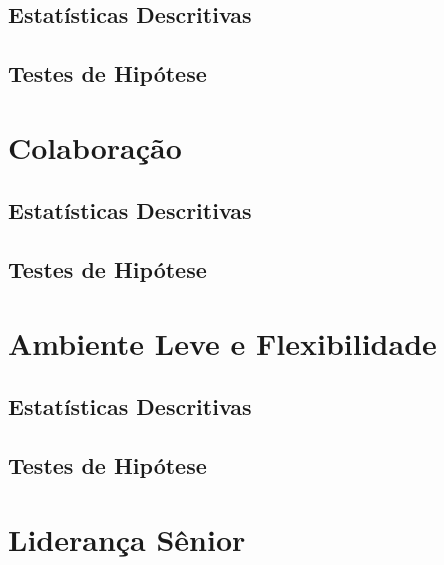 \documentclass[]{book}
\begin{document}
\hypertarget{estatisticas-descritivas-9}{%
\subsection{Estatísticas Descritivas}\label{estatisticas-descritivas-9}}

\hypertarget{testes-de-hipotese-9}{%
\subsection{Testes de Hipótese}\label{testes-de-hipotese-9}}

\hypertarget{colaboracao-1}{%
\section{Colaboração}\label{colaboracao-1}}

\hypertarget{estatisticas-descritivas-10}{%
\subsection{Estatísticas Descritivas}\label{estatisticas-descritivas-10}}

\hypertarget{testes-de-hipotese-10}{%
\subsection{Testes de Hipótese}\label{testes-de-hipotese-10}}

\hypertarget{ambiente-leve-e-flexibilidade-1}{%
\section{Ambiente Leve e Flexibilidade}\label{ambiente-leve-e-flexibilidade-1}}

\hypertarget{estatisticas-descritivas-11}{%
\subsection{Estatísticas Descritivas}\label{estatisticas-descritivas-11}}

\hypertarget{testes-de-hipotese-11}{%
\subsection{Testes de Hipótese}\label{testes-de-hipotese-11}}

\hypertarget{lideranca-senior-1}{%
\section{Liderança Sênior}\label{lideranca-senior-1}}
\end{document}
